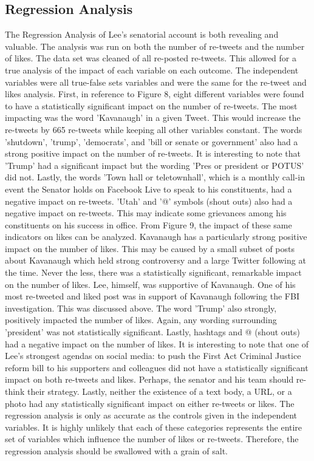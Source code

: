 \documentclass{article}
\begin{document}
\subsection{Regression Analysis}
\begin{flushleft}
The Regression Analysis of Lee's senatorial account is both revealing and valuable. The analysis was run on both the number of re-tweets and the number of likes. The data set was cleaned of all re-posted re-tweets. This allowed for a true analysis of the impact of each variable on each outcome. The independent variables were all true-false sets variables and were the same for the re-tweet and likes analysis. First, in reference to Figure 8, eight different variables were found to have a statistically significant impact on the number of re-tweets. The most impacting was the word 'Kavanaugh' in a given Tweet. This would increase the re-tweets by 665 re-tweets while keeping all other variables constant. The words 'shutdown', 'trump', 'democrats', and 'bill or senate or government' also had a strong positive impact on the number of re-tweets. It is interesting to note that 'Trump' had a significant impact but the wording 'Pres or president or POTUS' did not. Lastly, the words 'Town hall or teletownhall', which is a monthly call-in event the Senator holds on Facebook Live to speak to his constituents, had a negative impact on re-tweets. 'Utah' and '@' symbols (shout outs) also had a negative impact on re-tweets. This may indicate some grievances among his constituents on his success in office. From Figure 9, the impact of these same indicators on likes can be analyzed. Kavanaugh has a particularly strong positive impact on the number of likes. This may be caused by a small subset of posts about Kavanaugh which held strong controversy and a large Twitter following at the time. Never the less, there was a statistically significant, remarkable impact on the number of likes. Lee, himself, was supportive of Kavanaugh. One of his most re-tweeted and liked post was in support of Kavanaugh following the FBI investigation. This was discussed above. The word 'Trump' also strongly, positively impacted the number of likes. Again, any wording surrounding 'president' was not statistically significant. Lastly, hashtags and @ (shout outs) had a negative impact on the number of likes. It is interesting to note that one of Lee's strongest agendas on social media: to push the First Act Criminal Justice reform bill to his supporters and colleagues did not have a statistically significant impact on both re-tweets and likes. Perhaps, the senator and his team should re-think their strategy. Lastly, neither the existence of a text body, a URL, or a photo had any statistically significant impact on either re-tweets or likes. The regression analysis is only as accurate as the controls given in the independent variables. It is highly unlikely that each of these categories represents the entire set of variables which influence the number of likes or re-tweets. Therefore, the regression analysis should be swallowed with a grain of salt. 
\end{flushleft}
\end{document}
